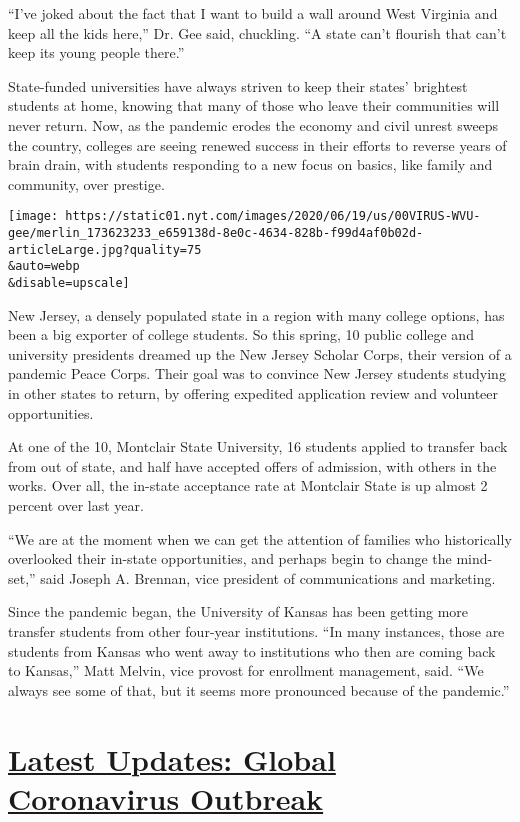 ``I've joked about the fact that I want to build a wall around West
Virginia and keep all the kids here,'' Dr. Gee said, chuckling. ``A
state can't flourish that can't keep its young people there.''

State-funded universities have always striven to keep their states'
brightest students at home, knowing that many of those who leave their
communities will never return. Now, as the pandemic erodes the economy
and civil unrest sweeps the country, colleges are seeing renewed success
in their efforts to reverse years of brain drain, with students
responding to a new focus on basics, like family and community, over
prestige.

\texttt{[image: https://static01.nyt.com/images/2020/06/19/us/00VIRUS-WVU-gee/merlin\_173623233\_e659138d-8e0c-4634-828b-f99d4af0b02d-articleLarge.jpg?quality=75\\\&auto=webp\\\&disable=upscale]}

New Jersey, a densely populated state in a region with many college
options, has been a big exporter of college students. So this spring, 10
public college and university presidents dreamed up the New Jersey
Scholar Corps, their version of a pandemic Peace Corps. Their goal was
to convince New Jersey students studying in other states to return, by
offering expedited application review and volunteer opportunities.

At one of the 10, Montclair State University, 16 students applied to
transfer back from out of state, and half have accepted offers of
admission, with others in the works. Over all, the in-state acceptance
rate at Montclair State is up almost 2 percent over last year.

``We are at the moment when we can get the attention of families who
historically overlooked their in-state opportunities, and perhaps begin
to change the mind-set,'' said Joseph A. Brennan, vice president of
communications and marketing.

Since the pandemic began, the University of Kansas has been getting more
transfer students from other four-year institutions. ``In many
instances, those are students from Kansas who went away to institutions
who then are coming back to Kansas,'' Matt Melvin, vice provost for
enrollment management, said. ``We always see some of that, but it seems
more pronounced because of the pandemic.''

\hypertarget{latest-updates-global-coronavirus-outbreak}{%
\section{\texorpdfstring{\href{https://www.nytimes.com/2020/08/01/world/coronavirus-covid-19.html?action=click\&pgtype=Article\&state=default\&region=MAIN_CONTENT_1\&context=storylines_live_updates}{Latest
Updates: Global Coronavirus
Outbreak}}{Latest Updates: Global Coronavirus Outbreak}}\label{latest-updates-global-coronavirus-outbreak}}

